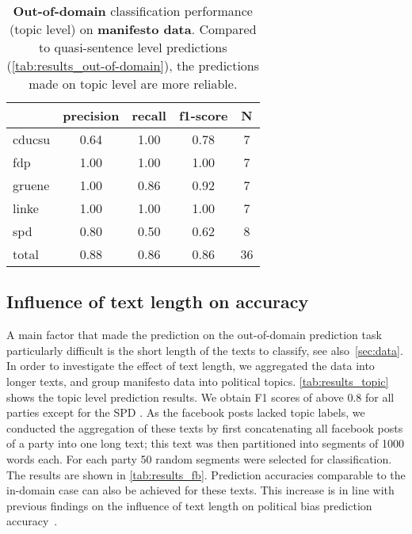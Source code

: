 \documentclass[11pt]{article}
\begin{document}
\begin{table}[t]
\caption{
\label{tab:results_topic}
{\bf Out-of-domain} classification performance (topic level) on {\bf manifesto data}. Compared to quasi-sentence level predictions (\autoref{tab:results_out-of-domain}), the predictions made on topic level are more reliable.}
\begin{center}
\begin{tabular}{lcccc}
    &         precision    &recall &  f1-score  & N  \\
    \hline
        \hline
cducsu     &  0.64  &    1.00  &    0.78    &     7\\
       fdp    &   1.00    &  1.00    &  1.00    &     7\\
    gruene  &     1.00  &    0.86  &    0.92    &     7\\
     linke    &   1.00   &   1.00     & 1.00    &     7\\
       spd   &    0.80   &   0.50    &  0.62     &    8\\
    \hline
total  &     0.88   &   0.86   &   0.86  &      36\\
\end{tabular}
\end{center}
\end{table}


\subsection{Influence of text length on accuracy}
A main factor that made the prediction on the out-of-domain prediction task particularly difficult is the short length of the texts to classify, see also~\autoref{sec:data}. In order to investigate the effect of text length, we aggregated the data into longer texts, and group manifesto data into political topics. \autoref{tab:results_topic} shows the topic level prediction results. We obtain F1 scores of above 0.8 for all parties except for the SPD . As the facebook posts lacked topic labels, we conducted the aggregation of these texts by first concatenating all facebook posts of a party into one long text; this text was then partitioned into segments of 1000 words each. For each party 50 random segments were selected for classification. The results are shown in \autoref{tab:results_fb}. Prediction accuracies comparable to the in-domain case can also be achieved for these texts. This increase is in line with previous findings on the influence of text length on political bias prediction accuracy~\cite{Hirst2014}. 
\end{document}
